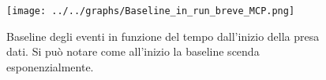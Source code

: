 \begin{figure}[h] \centering \texttt{[image: ../../graphs/Baseline\_in\_run\_breve\_MCP.png]}\caption{Baseline degli eventi in funzione del tempo dall'inizio della presa dati. Si può notare come all'inizio la baseline scenda esponenzialmente.}\label{gr:Baseline_in_run_breve_MCP} \end{figure}
